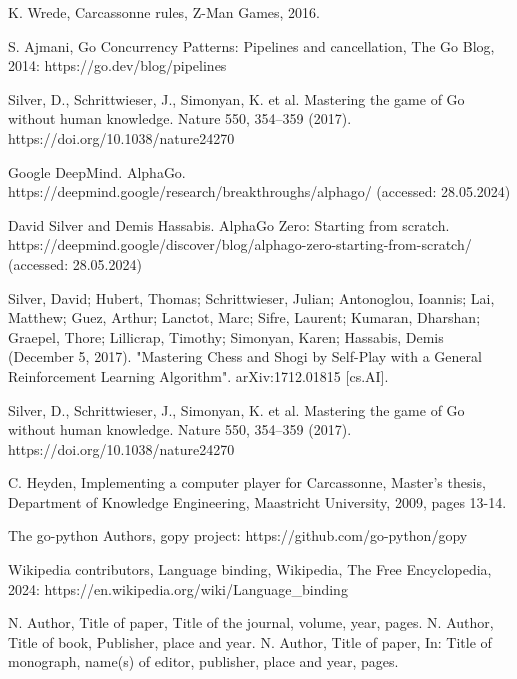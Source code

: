 \documentclass[11pt,twocolumn]{article}
\begin{document}
\begin{thebibliography}{00}
K. Wrede, Carcassonne rules, Z-Man Games, 2016.

S. Ajmani, Go Concurrency Patterns: Pipelines and cancellation, The Go Blog, 2014: https://go.dev/blog/pipelines

Silver, D., Schrittwieser, J., Simonyan, K. et al. Mastering the game of Go without human knowledge. Nature 550, 354–359 (2017). https://doi.org/10.1038/nature24270

Google DeepMind. AlphaGo. https://deepmind.google/research/breakthroughs/alphago/ (accessed: 28.05.2024)

David Silver and Demis Hassabis. Alpha{G}o {Z}ero: {S}tarting from scratch. https://deepmind.google/discover/blog/alphago-zero-starting-from-scratch/ (accessed: 28.05.2024)

 Silver, David; Hubert, Thomas; Schrittwieser, Julian; Antonoglou, Ioannis; Lai, Matthew; Guez, Arthur; Lanctot, Marc; Sifre, Laurent; Kumaran, Dharshan; Graepel, Thore; Lillicrap, Timothy; Simonyan, Karen; Hassabis, Demis (December 5, 2017). "Mastering Chess and Shogi by Self-Play with a General Reinforcement Learning Algorithm". arXiv:1712.01815 [cs.AI].

Silver, D., Schrittwieser, J., Simonyan, K. et al. Mastering the game of Go without human knowledge. Nature 550, 354–359 (2017). https://doi.org/10.1038/nature24270

C. Heyden, Implementing a computer player for Carcassonne, Master's thesis, Department of Knowledge Engineering, Maastricht University, 2009,
pages 13-14.

The go-python Authors, gopy project: https://github.com/go-python/gopy

Wikipedia contributors, Language binding, Wikipedia, The Free Encyclopedia, 2024:
https://en.wikipedia.org/wiki/Language\_binding

N. Author, Title of paper, Title of the journal, volume, year,
pages.
N. Author, Title of book, Publisher, place and
year.
N. Author, Title of paper, In: Title of monograph, name(s) of editor, publisher, place and year, pages.
\end{thebibliography}
\end{document}
